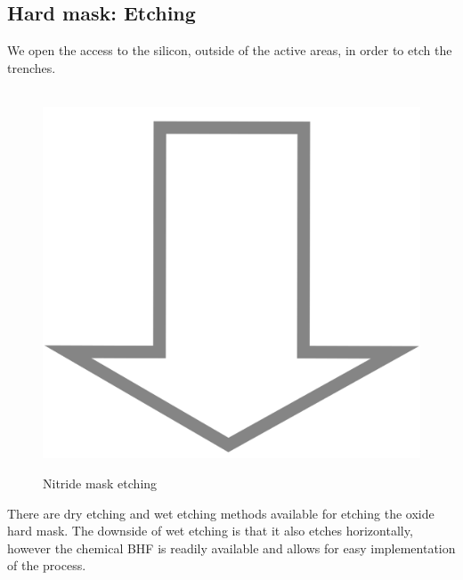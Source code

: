\subsection{Hard mask: Etching}\label{sti_mask_etch}

We open the access to the silicon, outside of the active areas, in order to etch the trenches.

\begin{figure}[H]
	\centering
	\begin{tikzpicture}[node distance = 3cm, auto, thick,scale=\CrossSectionOnly, every node/.style={transform shape}]
		
	\end{tikzpicture} \\
	\includegraphics[scale=0.01]{down_arrow.png} \\
	\begin{tikzpicture}[node distance = 3cm, auto, thick,scale=\CrossSectionOnly, every node/.style={transform shape}]
		
	\end{tikzpicture}
	\caption{Nitride mask etching}
\end{figure}

There are dry etching and wet etching methods available for etching the oxide hard mask. The downside of wet etching is that it also etches horizontally, however the chemical BHF is readily available and allows for easy implementation of the process.\\

